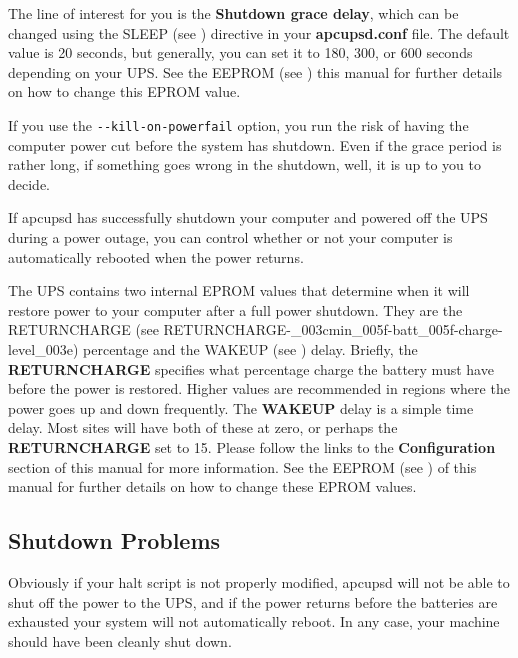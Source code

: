 {{{{{{{{{{{{\begin{verbatim}
\end{verbatim}
\normalsize

The line of interest for you is the {\bf Shutdown grace delay}, which can be
changed using the SLEEP (see 
) directive in your
{\bf apcupsd.conf} file. The default value is 20 seconds, but generally, you
can set it to 180, 300, or 600 seconds depending on your UPS. See the EEPROM
(see 
) this
manual for further details on how to change this EPROM value.  

If you use the \texttt{-{}-kill-on-powerfail} option, you run the risk of having
the computer power cut before the system has shutdown. Even if the grace
period is rather long, if something goes wrong in the shutdown, well, it is up
to you to decide.  

If apcupsd has successfully shutdown your computer and powered off the UPS
during a power outage, you can control whether or not your computer is
automatically rebooted when the power returns.  

The UPS contains two internal EPROM values that determine when it will restore
power to your computer after a full power shutdown. They are the RETURNCHARGE
(see 
{RETURNCHARGE-_003cmin_005f-batt_005f-charge-level_003e})
percentage and the WAKEUP (see 
) delay. Briefly, the
{\bf RETURNCHARGE} specifies what percentage charge the battery must have
before the power is restored. Higher values are recommended in regions where
the power goes up and down frequently. The {\bf WAKEUP} delay is a simple time
delay. Most sites will have both of these at zero, or perhaps the {\bf
RETURNCHARGE} set to 15. Please follow the links to the {\bf Configuration}
section of this manual for more information.  See the EEPROM (see 
) of this
manual for further details on how to change these EPROM values. 

\label{Shutdown-Problems}

\subsection*{Shutdown Problems}

Obviously if your halt script is not properly modified, apcupsd will not be
able to shut off the power to the UPS, and if the power returns before the
batteries are exhausted your system will not automatically reboot. In any
case, your machine should have been cleanly shut down. 

}}}}}}}}}}}}
